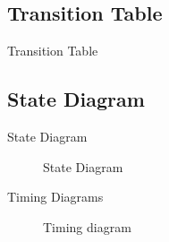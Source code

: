 \documentclass{beamer}
\begin{document}
\subsection{Transition Table}
\begin{frame}{Transition Table}
    
\begin{table}[h]
\centering


\label{tab:my-table}
\end{table}
\end{frame}

\subsection{State Diagram}
\begin{frame}{State Diagram}
 \begin{figure}[h]
    \centering
    
    \caption{State Diagram}
    \label{fig:statediag}
 \end{figure}
\end{frame}

\begin{frame}{Timing Diagrams}
  \begin{figure}
    \centering
   
    \caption{Timing diagram}
    \label{fig:my_label}
\end{figure}  
\end{frame}
\end{document}
